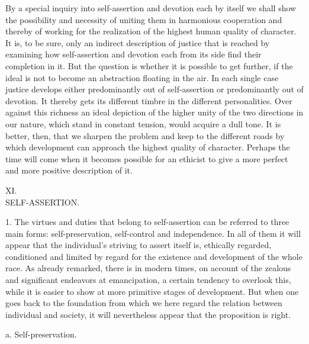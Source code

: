 \documentclass[12pt,a4paper,openany]{book}
\newcommand{\opage}[1]{\marginnote{\footnotesize\textit{[#1]}}}
\newcounter{etikch}
\newcommand{\chapterhead}[2]{\stepcounter{etikch}\bigskip\begin{center}\pdfbookmark[1]{#1 #2}{etikch.\arabic{etikch}}#1\\[3pt]{\large #2}\end{center}\medskip}
\begin{document}
By a special inquiry into self-assertion and devotion each by itself we shall show the possibility and necessity
of uniting them in harmonious cooperation and thereby of working for the realization of the highest human quality
of character. It is, to be sure, only an indirect description of justice that is reached by examining how
self-assertion and devotion each from its side find their completion in it. But the question is whether it is
possible to get further, if the ideal is not to become an abstraction floating in the air. In each single case
justice develops either predominantly out of self-assertion or predominantly out of devotion. It thereby gets its
different timbre in the different personalities. Over against this richness an ideal depiction of the higher unity
of the two directions in our nature, which stand in constant tension, would acquire a dull tone. It is better,
then, that we sharpen the problem and keep to the different roads by which development can approach the highest
quality of character. Perhaps the time will come when it becomes possible for an ethicist to give a more perfect
and more positive description of it.

\opage{207}\chapterhead{XI.}{SELF-ASSERTION.}

1. The virtues and duties that belong to self-assertion can be referred to three main forms:
self-preservation, self-control and independence. In all of them it will appear that the individual's
striving to assert itself is, ethically regarded, conditioned and limited by regard for the existence and
development of the whole race. As already remarked, there is in modern times, on account of the zealous and
significant endeavors at emancipation, a certain tendency to overlook this, while it is easier to show at
more primitive stages of development. But when one goes back to the foundation from which we here regard the
relation between individual and society, it will nevertheless appear that the proposition is right.

\begin{center}a. Self-preservation.\end{center}
\end{document}

